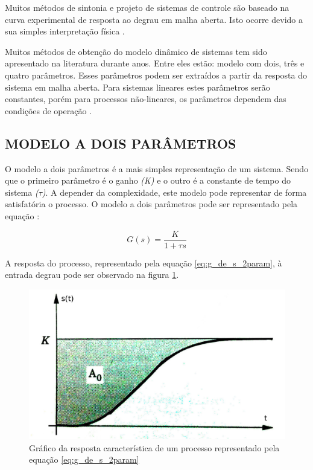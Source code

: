 \documentclass[12pt,oneside,a4paper, chapter=TITLE, section = TITLE, english, brazil]{abntex2}
\begin{document}
Muitos métodos de sintonia e projeto de sistemas de controle são baseado na curva experimental de resposta ao degrau em malha aberta. Isto ocorre devido a sua simples interpretação física \cite{astrom}.

Muitos métodos de obtenção do modelo dinâmico de sistemas tem sido apresentado na literatura durante anos. Entre eles estão: modelo com dois, três e quatro parâmetros. Esses parâmetros podem ser extraídos a partir da resposta do sistema em malha aberta. Para sistemas lineares estes parâmetros serão constantes, porém para processos não-lineares, os parâmetros dependem das condições de operação \cite{astrom}.


\subsection{MODELO A DOIS PARÂMETROS} \label{sec:mod_2_param}

O modelo a dois parâmetros é a mais simples representação de um sistema. Sendo que o primeiro parâmetro é o ganho \textit{(K)} e o outro é a constante de tempo do sistema \textit{($\tau$)}. A depender da complexidade, este modelo pode representar de forma satisfatória o processo. O modelo a dois parâmetros pode ser representado pela equação \cite{astrom}:

\begin{equation}
G(s) = \frac{K}{1 + \tau s} \label{eq:g_de_s_2param}
\end{equation}

A resposta do processo, representado pela equação \ref{eq:g_de_s_2param}, à entrada degrau  pode ser observado na figura \ref{fig:resp_g_de_s_2param}.

\begin{figure}[h] %
\centering
\includegraphics[scale=0.3]{./imagens/resp_g2}
\caption[Gráfico da resposta característica de um processo representado pela equação \ref{eq:g_de_s_2param}]{Gráfico da resposta característica de um processo representado pela equação \ref{eq:g_de_s_2param} \cite{astrom}}
\label{fig:resp_g_de_s_2param}
\end{figure}
\end{document}
